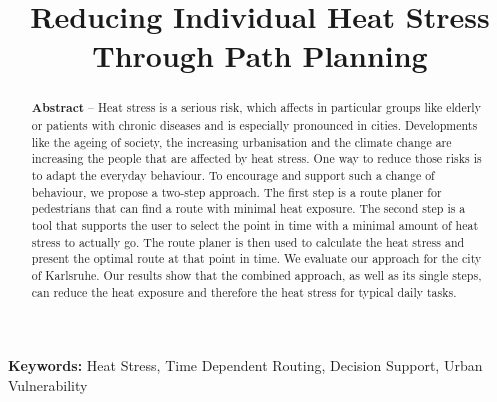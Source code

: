 \documentclass[a4paper,parskip=half]{scrartcl}
\title{Reducing Individual Heat Stress Through Path Planning}
\author{}
\providecommand{\keywords}[1]{\textbf{Keywords:} #1}
\begin{document}
\maketitle

\begin{abstract}
\noindent \textbf{Abstract} -- Heat stress is a serious risk, which affects in particular  groups like elderly or patients with chronic diseases and is especially pronounced in cities. Developments like the ageing of society, the increasing urbanisation and the climate change are increasing the people that are affected by heat stress. One way to reduce those risks is to adapt the everyday behaviour. 
To encourage and support such a change of behaviour, we propose a two-step approach. The first step is a route planer for pedestrians that can find a route with minimal heat exposure. The second step is a tool that supports the user to select the point in time with a minimal amount of heat stress to actually go. The route planer is then used to calculate the heat stress and present the optimal route at that point in time.
We evaluate our approach for the city of Karlsruhe. 	
Our results show that the combined approach, as well as its single steps, can reduce the heat exposure and therefore the heat stress for typical daily tasks.
\end{abstract}

\keywords{Heat Stress, Time Dependent Routing, Decision Support, Urban Vulnerability}






%


\printbibliography
\end{document}
